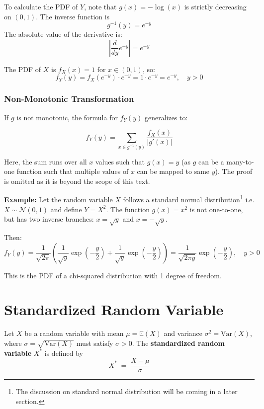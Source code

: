 \documentclass[twoside]{book}
\begin{document}
To calculate the PDF of $Y$, note that $g(x) = -\log(x)$ is strictly decreasing on $(0,1)$. The inverse function is $$g^{-1}(y) = e^{-y}$$
The absolute value of the derivative is:
\[
\left| \frac{d}{dy} e^{-y} \right| = e^{-y}
\]

The PDF of $X$ is $f_X(x) = 1$ for $x \in (0,1)$, so:
\[
f_Y(y) = f_X(e^{-y}) \cdot e^{-y} = 1 \cdot e^{-y} = e^{-y}, \quad y > 0
\]

\subsubsection*{Non-Monotonic Transformation}

If $g$ is not monotonic, the formula for $f_Y(y)$ generalizes to:
\begin{textbox}
\[
f_Y(y) = \sum_{x \in g^{-1}(y)} \frac{f_X(x)}{\left| g'(x) \right|}
\]
\end{textbox}

Here, the sum runs over all $x$ values such that $g(x) = y$ (as $g$ can be a many-to-one function such that multiple values of $x$ can be mapped to same $y$). The proof is omitted as it is beyond the scope of this text.

\vspace{2mm}

\textbf{Example:} Let the random variable $X$ follows a standard normal distribution\footnote{The discussion on standard normal distribution will be coming in a later section.} i.e. $X \sim \mathcal{N}(0,1)$ and define $Y = X^2$. The function $g(x) = x^2$ is not one-to-one, but has two inverse branches: $x = \sqrt{y}$ and $x = -\sqrt{y}$.

Then:
\[
f_Y(y) = \frac{1}{\sqrt{2\pi}} \left( \frac{1}{\sqrt{y}} \exp\left( -\frac{y}{2} \right) + \frac{1}{\sqrt{y}} \exp\left( -\frac{y}{2} \right) \right) = \frac{1}{\sqrt{2\pi y}} \exp\left( -\frac{y}{2} \right), \quad y > 0
\]

This is the PDF of a chi-squared distribution with 1 degree of freedom.

\section{Standardized Random Variable}

Let \(X\) be a random variable with mean \(\mu = \mathbb{E}(X)\) and variance \(\sigma^2 = \mathrm{Var}(X)\), where $\sigma = \sqrt{\mathrm{Var}(X)}$ must satisfy \(\sigma > 0\). The \textbf{standardized random variable} \(X^*\) is defined by
\[
  X^* \;=\; \frac{X - \mu}{\sigma}
\]
\end{document}

